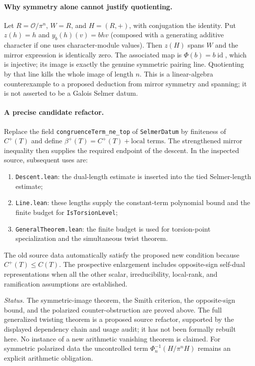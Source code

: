 \paragraph{Why symmetry alone cannot justify quotienting.}
Let $R=\mathcal O/\pi^n$, $W=R$, and $H=(R,+)$, with conjugation the
identity.  Put $z(h)=h$ and $y_b(h)(v)=bhv$ (composed with a
generating additive character if one uses character-module values).  Then $z(H)$
spans $W$ and the mirror expression is identically zero.  The associated
map is $\Phi(b)=b\operatorname{id}$, which is injective; its image is
exactly the genuine symmetric pairing line.  Quotienting by that line
kills the whole image of length $n$.  This is a linear-algebra
counterexample to a proposed deduction from mirror symmetry and spanning;
it is not asserted to be a Galois Selmer datum.

\paragraph{A precise candidate refactor.}
Replace the field \texttt{congruenceTerm\_ne\_top} of
\texttt{SelmerDatum} by finiteness of $C^+(T)$ and define
$\beta^+(T)=C^+(T)+\text{local terms}$.
The strengthened mirror inequality then supplies the required endpoint
of the descent.  In the inspected source, subsequent uses are:
\begin{enumerate}
\item \texttt{Descent.lean}: the dual-length estimate is inserted into the
      tied Selmer-length estimate;
\item \texttt{Line.lean}: these lengths supply the constant-term
      polynomial bound and the finite budget for \texttt{IsTorsionLevel};
\item \texttt{GeneralTheorem.lean}: the finite budget is used for
      torsion-point specialization and the simultaneous twist theorem.
\end{enumerate}
The old source data automatically satisfy the proposed new condition
because $C^+(T)\le C(T)$.  The prospective enlargement includes
opposite-sign self-dual representations when all the other scalar,
irreducibility, local-rank, and ramification assumptions are established.

\emph{Status.} The symmetric-image theorem, the Smith criterion, the
opposite-sign bound, and the polarized counter-obstruction are proved
above.  The full generalized twisting theorem is a proposed source
refactor, supported by the displayed dependency chain and usage audit;
it has not been formally rebuilt here.  No instance of a new arithmetic
vanishing theorem is claimed.  For symmetric polarized data the
uncontrolled term $\Phi_n^{-1}(H/\pi^nH)$ remains an explicit arithmetic
obligation.
